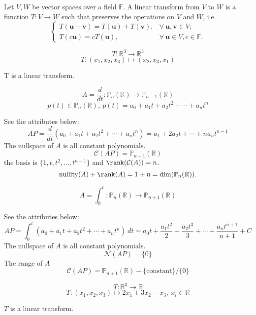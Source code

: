 
\begin{definition}[2T]
    Let $V, W$ be vector spaces over a field $\mathbb{F}$. A linear transform from $V$ to $W$ is a function $T: V \to W$ such that preserves the operations on $V$ and $W$, i.e.
    \[
        \begin{cases}
            T(\mathbf{u} + \mathbf{v}) = T(\mathbf{u}) + T(\mathbf{v}), & \forall\ \mathbf{u}, \mathbf{v} \in V; \\
            T(c\mathbf{u}) = cT(\mathbf{u}), & \forall\ \mathbf{u} \in V, c \in \mathbb{F}.
        \end{cases}
    \]
\end{definition}

\begin{eg}
    \[
        T: \mathbb{R}^3 \to \mathbb{R}^3
    \]
    \[
        T: (x_1, x_2, x_3) \mapsto (x_2, x_3, x_1)
    \]
\end{eg}
T is a linear transform.

\begin{eg}
    \[
        A = \frac{d}{dt}: \mathbb{P}_n(\mathbb{R}) \to \mathbb{P}_{n-1}(\mathbb{R})
    \]
    \[
        p(t) \in \mathbb{P}_n(\mathbb{R}), \ p(t) = a_0 + a_1 t + a_2 t^2 + \cdots + a_n t^n
    \]
\end{eg}
See the attributes below:
\[
    AP = \frac{d}{dt} (a_0 + a_1 t + a_2 t^2 + \cdots + a_n t^n) = a_1 + 2a_2 t + \cdots + n a_n t^{n-1}
\]
The nullspace of $A$ is all constant polynomials.
\[
    \mathcal{C}(AP) = \mathbb{P}_{n-1}(\mathbb{R})
\]
the basis is $\{1, t, t^2, \ldots, t^{n-1}\}$ and $\rank(\mathcal{C}(A)) = n$.
\[
    \text{nullity}(A) + \rank(A) = 1 + n = \dim(\mathbb{P}_n(\mathbb{R})).
\]

\begin{eg}
    \[
        A = \int_0^t: \mathbb{P}_n(\mathbb{R}) \to \mathbb{P}_{n+1}(\mathbb{R})
    \]  
\end{eg}
See the attributes below:
\[
    AP = \int_0^t (a_0 + a_1 t + a_2 t^2 + \cdots + a_n t^n)\ dt = a_0 t + \frac{a_1 t^2}{2} + \frac{a_2 t^3}{3} + \cdots + \frac{a_n t^{n+1}}{n+1} + C
\]
The nullspace of $A$ is all constant polynomials.
\[
    \mathcal{N}(AP) = \{0\}
\]
The range of $A$
\[
    \mathcal{C}(AP) = \mathbb{P}_{n+1}(\mathbb{R}) - \{\text{constant}\} / \{0\}
\]
\begin{eg}
    \[
        T: \mathbb{R}^3 \to \mathbb{R}
    \]
    \[
        T: (x_1, x_2, x_3) \mapsto 2x_1 + 3x_2 - x_3, \ x_i \in \mathbb{R}
    \]
\end{eg}
$T$ is a linear transform.
\newpage

